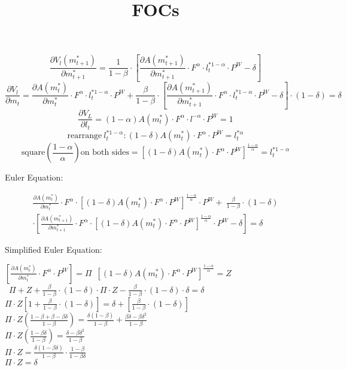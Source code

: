 \documentclass[12pt]{article}
\begin{document}
\title{FOCs}

\[\frac{\partial V_l(m^\ast_{t+1})}{\partial m^\ast_{t+1}}=\frac{1}{1-\beta}\cdot \left[\frac{\partial A(m^\ast_{t+1})}{\partial m^\ast_{t+1}}\cdot F^\alpha \cdot l^{\ast 1-\alpha}_t \cdot P^W-\delta\right]
\]
\[\frac{\partial V_l}{\partial m_t}=\frac{\partial A(m^\ast_t)}{\partial m^\ast_t} \cdot F^\alpha \cdot l^{\ast 1-\alpha}_t \cdot P^W+\frac{\beta}{1-\beta}\cdot \left[\frac{\partial A(m^\ast_{t+1})}{\partial m^\ast_{t+1}}\cdot F^\alpha \cdot l^{\ast 1-\alpha}_t \cdot P^W-\delta\right]\cdot(1-\delta)=\delta
\]
\[
\frac{\partial V_L}{\partial l_t}= (1-\alpha) A(m^\ast_t) \cdot F^\alpha \cdot l^{-\alpha} \cdot P^W =1
\]
\[
\text{rearrange}\ l^{\ast 1-\alpha}_t: (1-\delta)A(m^\ast_t)\cdot F^\alpha \cdot P^W=l^{\ast \alpha}_t
\]
\[
\text{square}\left(\frac{1-\alpha}{\alpha}\right)\text{on both sides}=\left[(1-\delta)A(m^\ast_t)\cdot F^\alpha \cdot P^W\right]^\frac{1-\alpha}{\alpha}= l^{\ast 1-\alpha}_t 
\]
\begin{flushleft}
Euler Equation:
\end{flushleft}
\begin{multline} 
\frac{\partial A(m^\ast_t)}{\partial m^\ast_t} \cdot F^\alpha \cdot \left[(1-\delta)A(m^\ast_t)\cdot F^\alpha \cdot P^W\right]^\frac{1-\alpha}{\alpha}\cdot P^W +\
\frac{\beta}{1-\beta}\cdot (1-\delta)\\\cdot\left[\frac{\partial A(m^\ast_{t+1})}{\partial m^\ast_{t+1}}\cdot F^\alpha\cdot \left[(1-\delta)A(m^\ast_t)\cdot F^\alpha\cdot P^W\right]^\frac{1-\alpha}{\alpha}\cdot P^W-\delta\right]=\delta
\end{multline}
\begin{flushleft}
Simplified Euler Equation:
\end{flushleft}
\begin{center}
$\left[\frac{\partial A(m^\ast_t)}{\partial m^\ast_t} \cdot F^\alpha\cdot P^W\right]=\Pi$\ $\left[(1-\delta)A(m^\ast_t)\cdot F^\alpha \cdot P^W\right]^\frac{1-\alpha}{\alpha}=Z$\\
\text{Then}\ $\Pi +Z+\frac{\beta}{1-\beta}\cdot (1-\delta)\cdot \Pi\cdot Z-\frac{\beta}{1-\beta}\cdot (1-\delta)\cdot \delta=\delta$ \\
$\Pi\cdot Z \left[1+\frac{\beta}{1-\beta}\cdot (1-\delta)\right]=\delta +\left[\frac{\beta}{1-\beta}\cdot (1-\delta)\right]$\\
$\Pi\cdot Z\left(\frac{1-\beta+\beta-\beta\delta}{1-\beta}\right)=\frac{\delta(1-\beta)}{1-\beta}+\frac{\beta\delta-\beta\delta^2}{1-\beta}$\\$\Pi\cdot Z\left(\frac{1-\beta\delta}{1-\beta}\right)=\frac{\delta-\beta\delta^2}{1-\beta}$\\
$\Pi\cdot Z=\frac{\delta(1-\beta\delta)}{1-\beta}\cdot\frac{1-\beta}{1-\beta\delta}$\\
$\Pi\cdot Z=\delta$
\end{center}
\end{document}
